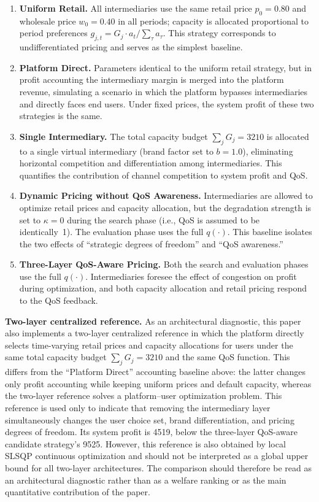 \documentclass[11pt,a4paper]{article}
\newcommand{\qos}{q}
\begin{document}
\begin{enumerate}[leftmargin=2em]
  \item \textbf{Uniform Retail.} All intermediaries use the same retail price $p_0=0.80$ and wholesale price $w_0=0.40$ in all periods; capacity is allocated proportional to period preferences $g_{j,t}=G_j\cdot a_t/\sum_\tau a_\tau$. This strategy corresponds to undifferentiated pricing and serves as the simplest baseline.
  \item \textbf{Platform Direct.} Parameters identical to the uniform retail strategy, but in profit accounting the intermediary margin is merged into the platform revenue, simulating a scenario in which the platform bypasses intermediaries and directly faces end users. Under fixed prices, the system profit of these two strategies is the same.
  \item \textbf{Single Intermediary.} The total capacity budget $\sum_j G_j=3210$ is allocated to a single virtual intermediary (brand factor set to $b=1.0$), eliminating horizontal competition and differentiation among intermediaries. This quantifies the contribution of channel competition to system profit and QoS.
  \item \textbf{Dynamic Pricing without QoS Awareness.} Intermediaries are allowed to optimize retail prices and capacity allocation, but the degradation strength is set to $\kappa=0$ during the search phase (i.e., QoS is assumed to be identically~1). The evaluation phase uses the full $\qos(\cdot)$. This baseline isolates the two effects of ``strategic degrees of freedom'' and ``QoS awareness.''
  \item \textbf{Three-Layer QoS-Aware Pricing.} Both the search and evaluation phases use the full $\qos(\cdot)$. Intermediaries foresee the effect of congestion on profit during optimization, and both capacity allocation and retail pricing respond to the QoS feedback.
\end{enumerate}

\textbf{Two-layer centralized reference.} As an architectural diagnostic, this paper also implements a two-layer centralized reference in which the platform directly selects time-varying retail prices and capacity allocations for users under the same total capacity budget $\sum_jG_j=3210$ and the same QoS function. This differs from the ``Platform Direct'' accounting baseline above: the latter changes only profit accounting while keeping uniform prices and default capacity, whereas the two-layer reference solves a platform--user optimization problem. This reference is used only to indicate that removing the intermediary layer simultaneously changes the user choice set, brand differentiation, and pricing degrees of freedom. Its system profit is 4519, below the three-layer QoS-aware candidate strategy's 9525. However, this reference is also obtained by local SLSQP continuous optimization and should not be interpreted as a global upper bound for all two-layer architectures. The comparison should therefore be read as an architectural diagnostic rather than as a welfare ranking or as the main quantitative contribution of the paper.
\end{document}
